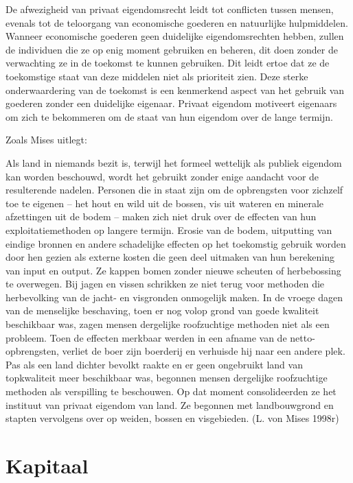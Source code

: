 \documentclass[
  a5paper,
  smalldemyvopaper,11pt,twoside,onecolumn,openright,extrafontsizes,
hidelinks]{memoir}
\begin{document}
De afwezigheid van privaat eigendomsrecht leidt tot conflicten tussen
mensen, evenals tot de teloorgang van economische goederen en
natuurlijke hulpmiddelen. Wanneer economische goederen geen duidelijke
eigendomsrechten hebben, zullen de individuen die ze op enig moment
gebruiken en beheren, dit doen zonder de verwachting ze in de toekomst
te kunnen gebruiken. Dit leidt ertoe dat ze de toekomstige staat van
deze middelen niet als prioriteit zien. Deze sterke onderwaardering van
de toekomst is een kenmerkend aspect van het gebruik van goederen zonder
een duidelijke eigenaar. Privaat eigendom motiveert eigenaars om zich te
bekommeren om de staat van hun eigendom over de lange termijn.

Zoals Mises uitlegt:

Als land in niemands bezit is, terwijl het formeel wettelijk als publiek
eigendom kan worden beschouwd, wordt het gebruikt zonder enige aandacht
voor de resulterende nadelen. Personen die in staat zijn om de
opbrengsten voor zichzelf toe te eigenen -- het hout en wild uit de
bossen, vis uit wateren en minerale afzettingen uit de bodem -- maken
zich niet druk over de effecten van hun exploitatiemethoden op langere
termijn. Erosie van de bodem, uitputting van eindige bronnen en andere
schadelijke effecten op het toekomstig gebruik worden door hen gezien
als externe kosten die geen deel uitmaken van hun berekening van input
en output. Ze kappen bomen zonder nieuwe scheuten of herbebossing te
overwegen. Bij jagen en vissen schrikken ze niet terug voor methoden die
herbevolking van de jacht- en visgronden onmogelijk maken. In de vroege
dagen van de menselijke beschaving, toen er nog volop grond van goede
kwaliteit beschikbaar was, zagen mensen dergelijke roofzuchtige methoden
niet als een probleem. Toen de effecten merkbaar werden in een afname
van de netto-opbrengsten, verliet de boer zijn boerderij en verhuisde
hij naar een andere plek. Pas als een land dichter bevolkt raakte en er
geen ongebruikt land van topkwaliteit meer beschikbaar was, begonnen
mensen dergelijke roofzuchtige methoden als verspilling te beschouwen.
Op dat moment consolideerden ze het instituut van privaat eigendom van
land. Ze begonnen met landbouwgrond en stapten vervolgens over op
weiden, bossen en visgebieden. (L. von Mises 1998r)

\chapter{Kapitaal}\label{sec-kapitaal}
\end{document}

